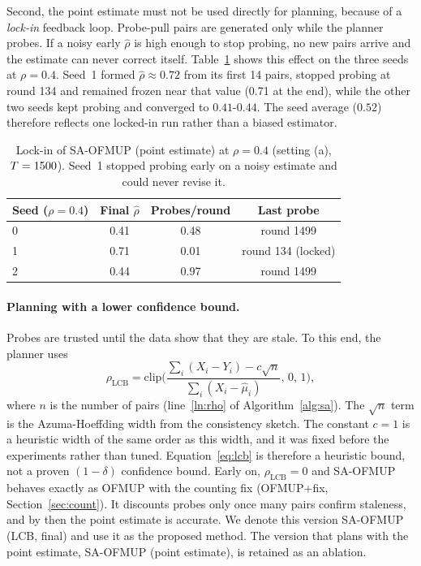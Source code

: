 \documentclass[letterpaper]{article}
\newcommand{\rhat}{\hat{\rho}}
\begin{document}
Second, the point estimate must not be used directly for planning, because of a
\emph{lock-in} feedback loop. Probe-pull pairs are generated only while the
planner probes. If a noisy early $\rhat$ is high enough to stop probing, no new
pairs arrive and the estimate can never correct itself. Table~\ref{tab:lockin}
shows this effect on the three seeds at $\rho=0.4$. Seed~1 formed
$\rhat\approx0.72$ from its first 14 pairs, stopped probing at round 134 and
remained frozen near that value (0.71 at the end), while the other two seeds
kept probing and converged to $0.41$-$0.44$. The seed average ($0.52$) therefore
reflects one locked-in run rather than a biased estimator.

\begin{table}[t]
\caption{Lock-in of SA-OFMUP (point estimate) at $\rho=0.4$ (setting (a), $T=1500$). Seed~1 stopped probing early on a noisy estimate and could never revise it.}
\label{tab:lockin}
\centering\small
\begin{tabular}{lccc}
\toprule
Seed ($\rho=0.4$) & Final $\rhat$ & Probes/round & Last probe \\
\midrule
0 & 0.41 & 0.48 & round 1499 \\
1 & 0.71 & 0.01 & round 134 (locked) \\
2 & 0.44 & 0.97 & round 1499 \\
\bottomrule
\end{tabular}
\end{table}

\paragraph{Planning with a lower confidence bound.}
Probes are trusted until the data show that they are stale. To this end, the
planner uses
\begin{equation}
  \rho_{\mathrm{LCB}}=\mathrm{clip}\Big(\frac{\sum_i(X_i-Y_i)-c\sqrt{n}}{\sum_i(X_i-\hat\mu_i)},\,0,\,1\Big),
  \label{eq:lcb}
\end{equation}
where $n$ is the number of pairs (line~\ref{ln:rho} of Algorithm~\ref{alg:sa}).
The $\sqrt n$ term is the Azuma-Hoeffding width from the consistency sketch.
The constant $c=1$ is a heuristic width of the same order as this width, and it
was fixed before the experiments rather than tuned. Equation~\eqref{eq:lcb} is
therefore a heuristic bound, not a proven $(1-\delta)$ confidence bound. Early
on, $\rho_{\mathrm{LCB}}=0$ and SA-OFMUP behaves exactly as OFMUP with the
counting fix (OFMUP+fix, Section~\ref{sec:count}). It discounts probes only once
many pairs confirm staleness, and by then the point estimate is accurate. We
denote this version SA-OFMUP (LCB, final) and use it as the proposed method. The
version that plans with the point estimate, SA-OFMUP (point estimate), is
retained as an ablation.
\end{document}
